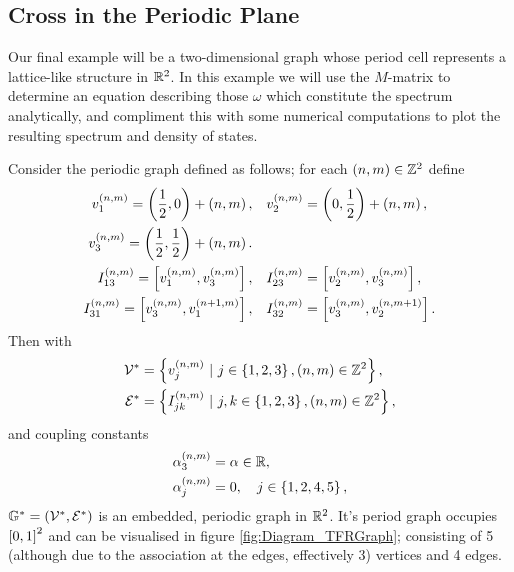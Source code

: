\subsection{Cross in the Periodic Plane} \label{ssec:ExampleCrossInPlane}
Our final example will be a two-dimensional graph whose period cell represents a lattice-like structure in $\mathbb{R}^2$.
In this example we will use the $M$-matrix to determine an equation describing those $\omega$ which constitute the spectrum analytically, and compliment this with some numerical computations to plot the resulting spectrum and density of states. \newline

Consider the periodic graph defined as follows; for each $\left( n,m \right)\in\mathbb{Z}^2$ define
\begin{align*}
	v_1^{\left( n,m \right)} = \left( \frac{1}{2},0 \right) + \left( n,m \right), 
	&\quad v_2^{\left( n,m \right)} = \left( 0,\frac{1}{2} \right) + \left( n,m \right), \\
	v_3^{\left( n,m \right)} = \left( \frac{1}{2},\frac{1}{2} \right) + \left( n,m \right). & \\
	I_{13}^{\left( n,m \right)} = \left[ v_1^{\left( n,m \right)}, v_3^{\left( n,m \right)} \right],
	&\quad I_{23}^{\left( n,m \right)} = \left[ v_2^{\left( n,m \right)}, v_3^{\left( n,m \right)} \right], \\
	I_{31}^{\left( n,m \right)} = \left[ v_3^{\left( n,m \right)}, v_1^{\left( n+1,m \right)} \right],
	&\quad I_{32}^{\left( n,m \right)} = \left[ v_3^{\left( n,m \right)}, v_2^{\left( n,m+1 \right)} \right].
\end{align*}
Then with 
\begin{align*}
	\vertSet^* &= \clbracs{v_j^{\bracs{n,m}} \ \vert \ j\in\clbracs{1,2,3}, \bracs{n,m}\in\integers^2}, \\
	\edgeSet^* &= \clbracs{I_{jk}^{\bracs{n,m}} \ \vert \ j,k\in\clbracs{1,2,3}, \bracs{n,m}\in\integers^2},
\end{align*}
and coupling constants
\begin{align*}
	\alpha_3^{\left( n,m \right)} &= \alpha \in\mathbb{R}, \\
	\alpha_j^{\left( n,m \right)} &= 0, \quad j\in\left\{ 1,2,4,5 \right\},
\end{align*}
$\mathbb{G}^* = \left( \mathcal{V}^*,\mathcal{E}^* \right)$ is an embedded, periodic graph in $\mathbb{R}^2$.
It's period graph occupies $\left[ 0,1 \right]^2$ and can be visualised in figure \ref{fig:Diagram_TFRGraph}; consisting of 5 (although due to the association at the edges, effectively 3) vertices and 4 edges.

